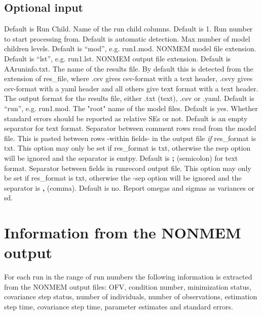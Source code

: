 \subsection{Optional input}
\begin{optionlist}
Default is Run Child. Name of the run child columns.
\nextopt
{}
Default is 1. Run number to start processing from.  
\nextopt
{}
Default is automatic detection. Max number of model children levels. 
\nextopt
{}
Default is “mod”, e.g. run1.mod. NONMEM model file extension. 
\nextopt
{}
Default is “lst”, e.g. run1.lst. NONMEM output file extension. 
\nextopt
{}
Default is AAruninfo.txt. The name of the results file.  
\nextopt
{}
By default this is detected from the extension of res\_file, where .csv gives csv-format with a text header, .csvy gives csv-format with a yaml header and all others give text format with a text header.\\ The output format for the results file, either .txt (text), .csv or .yaml.
\nextopt
{}
Default is “run”, e.g. run1.mod. The "root" name of the model files. 
\nextopt
{}
Default is yes. Whether standard errors should be reported as relative SEs or not. 
\nextopt
{}
Default is an empty separator for text format.	Separator between comment rows read from the model file. This is pasted between rows -within fields- in the output file \emph{if} res\_format is txt. This option may only be set if res\_format is txt, otherwise the rsep option will be ignored and the separator is emtpy. 
\nextopt
{}
Default is \textbf{;} (semicolon) for text format. Separator between fields in runrecord output file. This option may
only be set if res\_format is txt, otherwise the -sep option will be ignored and the separator is \textbf{,} (comma).
\nextopt
{}
Default is no. Report omegas and sigmas as variances or sd.
\nextopt
\end{optionlist}

\section{Information from the NONMEM output}
For each run in the range of run numbers the following information is extracted from the NONMEM output files: OFV, condition number, minimization status, covariance step status, number of individuals, number of observations, estimation step time, covariance step time, parameter estimates and standard errors. 

